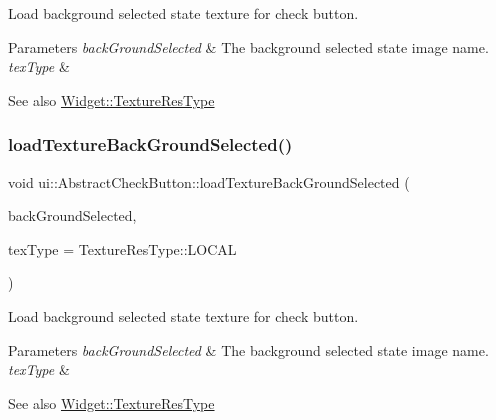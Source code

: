 Load background selected state texture for check button.


\begin{DoxyParams}{Parameters}
{\em back\+Ground\+Selected} & The background selected state image name. \\
\hline
{\em tex\+Type} & \\
\hline
\end{DoxyParams}
\begin{DoxySeeAlso}{See also}
{\ttfamily \hyperlink{classui_1_1Widget_a040a65ec5ad3b11119b7e16b98bd9af0}{Widget\+::\+Texture\+Res\+Type}} 
\end{DoxySeeAlso}
\mbox{\label{classui_1_1AbstractCheckButton_a060437afe2b6064928901d4839b2c5dc}} 
\subsubsection{\texorpdfstring{load\+Texture\+Back\+Ground\+Selected()}{loadTextureBackGroundSelected()}\hspace{0.1cm}{\footnotesize\ttfamily [2/2]}}
{\footnotesize\ttfamily void ui\+::\+Abstract\+Check\+Button\+::load\+Texture\+Back\+Ground\+Selected (\begin{DoxyParamCaption}\item[{const std\+::string \&}]{back\+Ground\+Selected,  }\item[{\hyperlink{classui_1_1Widget_a040a65ec5ad3b11119b7e16b98bd9af0}{Texture\+Res\+Type}}]{tex\+Type = {\ttfamily TextureResType\+:\+:LOCAL} }\end{DoxyParamCaption})}

Load background selected state texture for check button.


\begin{DoxyParams}{Parameters}
{\em back\+Ground\+Selected} & The background selected state image name. \\
\hline
{\em tex\+Type} & \\
\hline
\end{DoxyParams}
\begin{DoxySeeAlso}{See also}
{\ttfamily \hyperlink{classui_1_1Widget_a040a65ec5ad3b11119b7e16b98bd9af0}{Widget\+::\+Texture\+Res\+Type}} 
\end{DoxySeeAlso}
\mbox{\label{classui_1_1AbstractCheckButton_a8a94e8e135a5e8d1d0be187d77970323}} 
